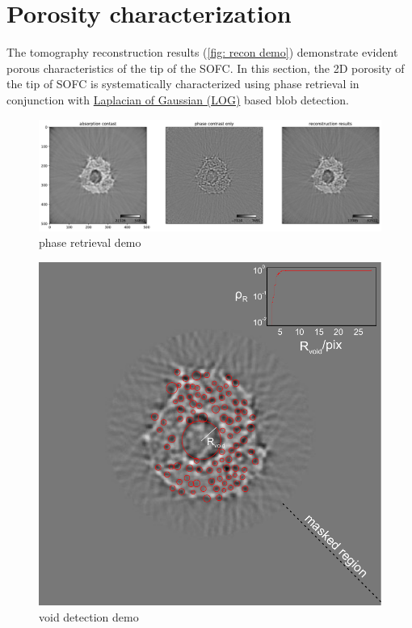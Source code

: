 \documentclass[12pt]{scrartcl}
\newcommand{\myscale}{1}
\begin{document}
\section{Porosity characterization}\label{sec: porosity characterization}

The tomography reconstruction results (\cref{fig: recon demo}) demonstrate evident porous characteristics of the tip of the SOFC.
In this section, the 2D porosity of the tip of SOFC is systematically characterized using phase retrieval in conjunction with \href{https://en.wikipedia.org/wiki/Blob_detection}{Laplacian of Gaussian (LOG)} based blob detection.

\renewcommand{\myscale}{0.42}
\begin{figure}
\centering
\includegraphics[scale=\myscale]{phaseRetrievalDemo}
\caption{
phase retrieval demo
}\label{fig: phase retrieval demo}
\end{figure}


\renewcommand{\myscale}{.5}
\begin{figure}
\centering
\includegraphics[scale=\myscale]{voidDetectionDemo_mid}
\caption{
void detection demo
}\label{fig: void detection demo}
\end{figure}
\end{document}
